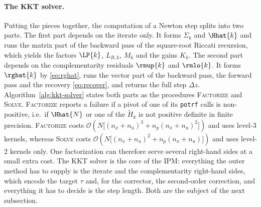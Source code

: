 \paragraph{The KKT solver.}
Putting the pieces together, the computation of a Newton step splits into two parts.
The first part depends on the iterate only.
It forms $\Sigma_k$ and $\Hhat{k}$ and runs the matrix part of the backward pass of the square-root Riccati recursion, which yields the factors $\LP{k}$, $L_{R,k}$, $M_k$ and the gains $K_k$.
The second part depends on the complementarity residuals $\rmup{k}$ and $\rmlo{k}$.
It forms $\rghat{k}$ by \eqref{eq:rghat}, runs the vector part of the backward pass, the forward pass and the recovery \eqref{eq:recover}, and returns the full step $\Delta z$.
Algorithm~\ref{alg:kkt-solver} states both parts as the procedures \textsc{Factorize} and \textsc{Solve}.
\textsc{Factorize} reports a failure if a pivot of one of its \texttt{potrf} calls is non-positive, i.e.\ if $\Hhat{N}$ or one of the $\tilde{H}_k$ is not positive definite in finite precision.
\textsc{Factorize} costs $\mathcal{O}\!\left(N \big[(n_x + n_u)^3 + n_p (n_x + n_u)^2\big]\right)$ and uses level-3 kernels, whereas \textsc{Solve} costs $\mathcal{O}\!\left(N \big[(n_x + n_u)^2 + n_p (n_x + n_u)\big]\right)$ and uses level-2 kernels only.
One factorization can therefore serve several right-hand sides at a small extra cost.
The KKT solver is the core of the IPM: everything the outer method has to supply is the iterate and the complementarity right-hand sides, which encode the target $\tau$ and, for the corrector, the second-order correction, and everything it has to decide is the step length.
Both are the subject of the next subsection.

